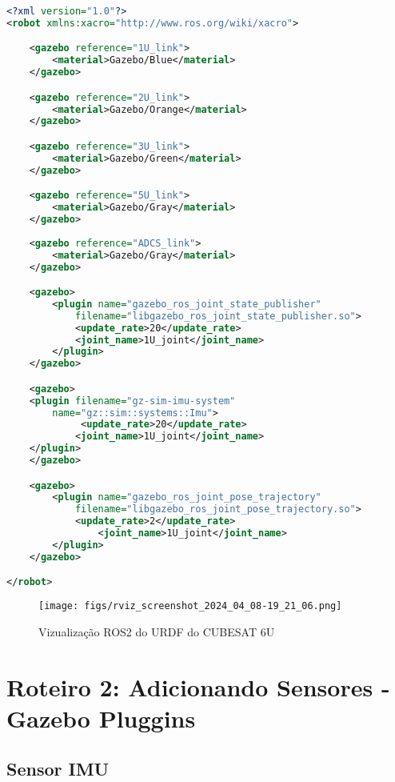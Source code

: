\begin{lstlisting}[language=XML,caption={XML version}]
<?xml version="1.0"?>
<robot xmlns:xacro="http://www.ros.org/wiki/xacro">

    <gazebo reference="1U_link">
        <material>Gazebo/Blue</material>
    </gazebo>

    <gazebo reference="2U_link">
        <material>Gazebo/Orange</material>
    </gazebo>

    <gazebo reference="3U_link">
        <material>Gazebo/Green</material>
    </gazebo>

    <gazebo reference="5U_link">
        <material>Gazebo/Gray</material>
    </gazebo>
    
    <gazebo reference="ADCS_link">
        <material>Gazebo/Gray</material>
    </gazebo>

    <gazebo>
        <plugin name="gazebo_ros_joint_state_publisher"
            filename="libgazebo_ros_joint_state_publisher.so">
            <update_rate>20</update_rate>
            <joint_name>1U_joint</joint_name>
        </plugin>
    </gazebo>

    <gazebo>
	<plugin filename="gz-sim-imu-system"
        name="gz::sim::systems::Imu">
             <update_rate>20</update_rate>
            <joint_name>1U_joint</joint_name>
	</plugin>
    </gazebo>

    <gazebo>
        <plugin name="gazebo_ros_joint_pose_trajectory"
            filename="libgazebo_ros_joint_pose_trajectory.so">
            <update_rate>2</update_rate>
                <joint_name>1U_joint</joint_name>
        </plugin>
    </gazebo>

</robot>
\end{lstlisting}



\begin{figure}[htpb]
\centering
\texttt{[image: figs/rviz\_screenshot\_2024\_04\_08-19\_21\_06.png]}
\caption{Vizualização ROS2 do URDF do CUBESAT 6U}
\label{fig:12}
\end{figure}

\section{Roteiro 2: Adicionando Sensores -  Gazebo Pluggins}

\subsection{Sensor IMU}

